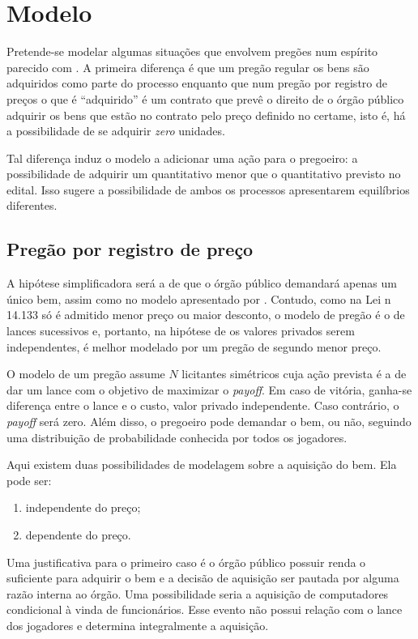 \chapter{Modelo}
\label{cap:modelo}

Pretende-se modelar algumas situações que envolvem pregões num espírito parecido com \citet{Bugarin2022}. A primeira diferença é que um pregão regular os bens são adquiridos como parte do processo enquanto que num pregão por registro de preços o que é ``adquirido'' é um contrato que prevê o direito de o órgão público adquirir os bens que estão no contrato pelo preço definido no certame, isto é, há a possibilidade de se adquirir \emph{zero} unidades.

Tal diferença induz o modelo a adicionar uma ação para o pregoeiro: a possibilidade de adquirir um quantitativo menor que o quantitativo previsto no edital. Isso sugere a possibilidade de ambos os processos apresentarem equilíbrios diferentes.

\section{Pregão por registro de preço}

A hipótese simplificadora será a de que o órgão público demandará apenas um único bem, assim como no modelo apresentado por \citet{Bugarin2022}. Contudo, como na Lei n{\textordmasculine} 14.133 só é admitido menor preço ou maior desconto, o modelo de pregão é o de lances sucessivos e, portanto, na hipótese de os valores privados serem independentes, é melhor modelado por um pregão de segundo menor preço.

O modelo de um pregão assume $N$ licitantes simétricos cuja ação prevista é a de dar um lance com o objetivo de maximizar o \emph{payoff}. Em caso de vitória, ganha-se diferença entre o lance e o custo, valor privado independente. Caso contrário, o \emph{payoff} será zero. Além disso, o pregoeiro pode demandar o bem, ou não, seguindo uma distribuição de probabilidade conhecida por todos os jogadores.

Aqui existem duas possibilidades de modelagem sobre a aquisição do bem. Ela pode ser:
\begin{enumerate}
	\item independente do preço;
	\item dependente do preço.
\end{enumerate}

Uma justificativa para o primeiro caso é o órgão público possuir renda o suficiente para adquirir o bem e a decisão de aquisição ser pautada por alguma razão interna ao órgão. Uma possibilidade seria a aquisição de computadores condicional à vinda de funcionários. Esse evento não possui relação com o lance dos jogadores e determina integralmente a aquisição.


